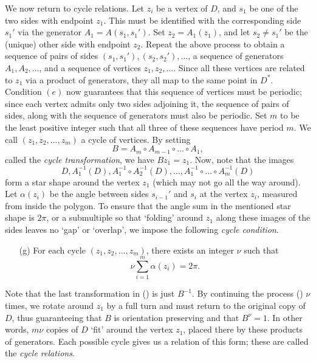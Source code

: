 \documentclass[12pt]{article}
\theoremstyle{definition}
\theoremstyle{remark}
\begin{document}
    We now return to cycle relations. Let $z_i$ be a vertex of $D$, and $s_1$ be one
    of the two sides with endpoint $z_1$. This must be identified with the
    corresponding side $s_1'$ via the generator $A_1 = A(s_1, s_1')$. Set $z_2 =
    A_1(z_1)$, and let $s_2 \neq s_1'$ be the (unique) other side with endpoint
    $z_2$. Repeat the above process to obtain a sequence of pairs of sides $(s_1,
    s_1'), (s_2, s_2'), \dots$, a sequence of generators $A_1, A_2, \dots$, and a
    sequence of vertices $z_1, z_2, \dots$. Since all these vertices are related to
    $z_1$ via a product of generators, they all map to the same point in $D^*$.
    Condition $(e)$ now guarantees that this sequence of vertices must be periodic;
    since each vertex admits only two sides adjoining it, the sequence of pairs of
    sides, along with the sequence of generators must also be periodic. Set $m$ to be
    the least positive integer such that all three of these sequences have period
    $m$. We call $(z_1, z_2, \dots, z_m)$ a cycle of vertices. By setting \[
        B = A_m \circ A_{m - 1} \circ \dots \circ A_1,
    \] called the \emph{cycle transformation}, we have $Bz_1 = z_1$. Now, note that
    the images \[
        D, A_1^{-1} (D), A_1^{-1} \circ A_2^{-1} (D), \dots, A_1^{-1} \circ
        \dots \circ A_m^{-1} (D) \tag{\star}
    \] form a star shape around the vertex $z_1$ (which may not go all the way
    around). Let $\alpha(z_i)$ be the angle between sides $s_{i - 1}'$ and $s_i$ at
    the vertex $z_i$, measured from inside the polygon. To ensure that the angle sum
    in the mentioned star shape is $2\pi$, or a submultiple so that `folding' around
    $z_1$ along these images of the sides leaves no `gap' or `overlap', we impose the
    following \emph{cycle condition}. \begin{itemize}
        \item[(g)] For each cycle $(z_1, z_2, \dots, z_m)$, there exists an integer
        $\nu$ such that \[
            \nu \sum_{i = 1}^m \alpha(z_i) = 2\pi.
        \]
    \end{itemize}
    Note that the last transformation in (\star) is just $B^{-1}$. By continuing the
    process (\star) $\nu$ times, we rotate around $z_1$ by a full turn and must
    return to the original copy of $D$, thus guaranteeing that $B$ is orientation
    preserving and that $B^\nu = 1$. In other words, $m\nu$ copies of $D$ `fit'
    around the vertex $z_1$, placed there by these products of generators.  Each
    possible cycle gives us a relation of this form; these are called the \emph{cycle
    relations}.
\end{document}
